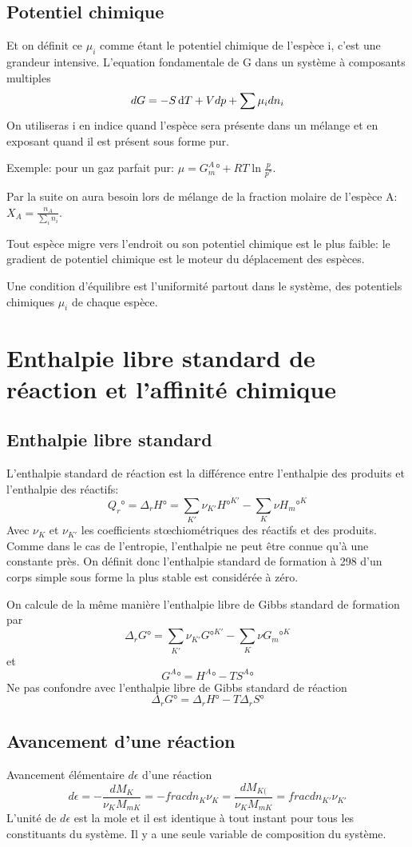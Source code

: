 \subsection{Potentiel chimique}
Et on définit ce $\mu_i$ comme étant le potentiel chimique de l'espèce i,
c'est une grandeur intensive.
L'equation fondamentale de G dans un système à composants multiples
\[ dG = -S\operatorname{d}\! T+Vdp+\sum \mu_idn_i \]
On utiliseras i en indice quand l'espèce sera présente dans un mélange et
en exposant quand il est présent sous forme pur.

Exemple: pour un gaz parfait pur: $\mu = G_m^A°+RT \ln \frac p{p°}$.

Par la suite on aura besoin lors de mélange de la fraction molaire de
l'espèce A: $ X_A = \frac{n_A}{\sum_in_i}$.

Tout espèce migre vers l'endroit ou son potentiel chimique est le plus faible:
le gradient de potentiel chimique est le moteur du déplacement des espèces.

Une condition d'équilibre est l'uniformité partout dans le système,
des potentiels chimiques $\mu_i$ de chaque espèce.

\section{Enthalpie libre standard de réaction et l'affinité chimique}
\subsection{Enthalpie libre standard}
L'enthalpie standard de réaction est la différence entre
l'enthalpie des produits et l'enthalpie des réactifs:
\[ Q_r° = \Delta_rH° = \sum_{K'}\nu_{K'}H°^{K'}-\sum_K\nu H_m°^K \]
Avec $\nu_K$ et $\nu_{K'}$ les coefficients stœchiométriques
des réactifs et des produits.
Comme dans le cas de l'entropie,
l'enthalpie ne peut être connue qu'à une constante près.
On définit donc l'enthalpie standard de formation
à \si{298}{\kelvin}
d'un corps simple sous forme la plus stable  est considérée à zéro.

On calcule de la même manière
l'enthalpie libre de Gibbs standard de formation par
\[ \Delta_rG° = \sum_{K'}\nu_{K'}G°^{K'}-\sum_K\nu G_m°^K \]
et
\[ G^A° = H^A°-TS^A° \]
Ne pas confondre avec l'enthalpie libre de Gibbs standard de réaction
\[ \Delta_rG° = \Delta_rH°-T\Delta_rS° \]

\subsection{Avancement d'une réaction}
Avancement élémentaire $d\epsilon$ d'une réaction
\[ d\epsilon = -\frac{dM_K}{\nu_KM_{mK}} = -frac{dn_K}{\nu_K} =
\frac{dM_{K(}}{\nu_{K}M_{mK}} = frac{dn_{K'}}{\nu_{K'}} \]
L'unité de $d\epsilon$ est la mole et il est identique
à tout instant pour tous les constituants du système.
Il y a une seule variable de composition du système.


